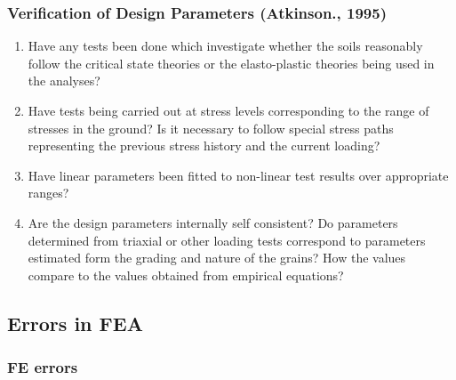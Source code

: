 \documentclass[notes]{beamer}
\begin{document}
\begin{frame}
\frametitle{Verification of Design Parameters (Atkinson., 1995)}
\begin{enumerate}
	\item Have any tests been done which investigate whether the soils
	reasonably follow the critical state theories or the elasto-plastic
	theories being used in the analyses?
	\item Have tests being carried out at stress levels corresponding to
	the range of stresses in the ground? Is it necessary to follow
	special stress paths representing the previous stress history and
	the current loading?
	\item Have linear parameters been fitted to non-linear test results over
	appropriate ranges?
	\item Are the design parameters internally self consistent? Do
	parameters determined from triaxial or other loading tests
	correspond to parameters estimated form the grading and
	nature of the grains? How the values compare to the values
	obtained from empirical equations?
\end{enumerate}
\end{frame}


\subsection{Errors in FEA}
\begin{frame}
\frametitle{FE errors}
\end{frame}
\end{document}
